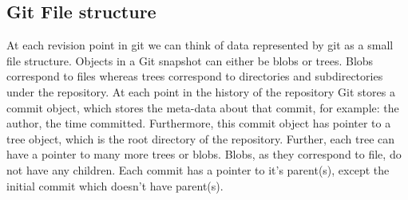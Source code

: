 \documentclass[12pt,twoside,notitlepage]{report}
\begin{document}
\subsection{Git File structure}
At each revision point in git we can think of data represented by git as a small file structure. Objects in a Git snapshot can either be blobs or trees. Blobs correspond to files whereas trees correspond to directories and subdirectories under the repository. At each point in the history of the repository Git stores a commit object, which stores the meta-data about that commit, for example: the author, the time committed. Furthermore, this commit object has pointer to a tree object, which is the root directory of the repository. Further, each tree can have a pointer to many more trees or blobs. Blobs, as they correspond to file, do not have any children. Each commit has a pointer to it's parent(s), except the initial commit which doesn't have parent(s).
\end{document}
